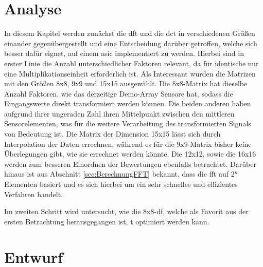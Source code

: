  
 
 
 
 
\chapter{Analyse}
In diesem Kapitel werden zunächst die \gls{dft} und die \gls{dct} in verschiedenen Größen einander gegenübergestellt und eine Entscheidung darüber getroffen, welche
sich besser dafür eignet, auf einem \gls{asic} implementiert zu werden. Hierbei sind in erster Linie die Anzahl unterschiedlicher Faktoren relevant, 
da für identische  nur eine Multiplikationseinheit erforderlich ist.
Als Interessant wurden die Matrizen mit den Größen 8x8, 9x9 und 15x15 ausgewählt. 
Die 8x8-Matrix hat dieselbe Anzahl Faktoren, wie das derzeitige Demo-Array Sensore hat, sodass die Eingangswerte direkt transformiert werden können. 
Die beiden anderen haben aufgrund ihrer ungeraden Zahl ihren Mittelpunkt zwischen den mittleren Sensorelementen, was für die 
weitere Verarbeitung des transformierten Signals von Bedeutung ist. Die Matrix der Dimension 15x15 lässt sich durch Interpolation der Daten errechnen, während es für
die 9x9-Matrix bisher keine Überlegungen gibt, wie sie errechnet werden könnte.
Die 12x12, sowie die 16x16 werden zum besseren Einordnen der Bewertungen ebenfalls betrachtet.
Darüber hinaus ist aus Abschnitt \ref{sec:BerechnungFFT} bekannt, dass die \gls{fft} auf 2$^n$ Elementen basiert und es sich hierbei um ein sehr schnelles und 
effizientes Verfahren handelt. 

Im zweiten Schritt wird untersucht, wie die 8x8-\gls{df, welche als Favorit aus der ersten Betrachtung herausgegangen ist, t} optimiert werden kann.



 
 
 
 

 
 
 
\chapter{Entwurf}

 

 
 
 
 
  
 
 
 


